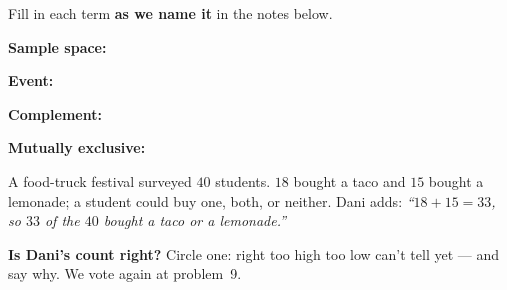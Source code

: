 \documentclass[12pt]{article}
\newcommand{\termrowheight}{2.3cm}
\newlength{\termrowinset}\setlength{\termrowinset}{7pt}
\newcommand{\vterm}[1]{%
  \par\noindent\begin{minipage}[t][\termrowheight][t]{\linewidth}%
    \vspace*{\termrowinset}%
    \textbf{\textcolor{cerulean}{#1:}}%
  \end{minipage}\par}
\begin{document}

\vspace{0.15in}

\boxguard[16]
\begin{vocabbox}
\small
Fill in each term \textbf{as we name it} in the notes below.
\vterm{Sample space}
\vterm{Event}
\vterm{Complement}
\vterm{Mutually exclusive}
\end{vocabbox}

\boxguard[12]
\begin{hookbox}
\small
A food-truck festival surveyed $40$ students. $18$ bought a taco and $15$ bought a lemonade; a
student could buy one, both, or neither. Dani adds: \emph{``$18 + 15 = 33$, so $33$ of the $40$
bought a taco or a lemonade.''}

\vspace{3pt}
\textbf{Is Dani's count right?} Circle one: \quad right \qquad too high \qquad too low \qquad
can't tell yet --- and say why. We vote again at problem~9.
\par{}
\end{hookbox}
\end{document}
